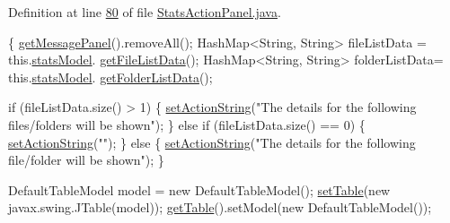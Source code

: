 Definition at line \hyperlink{L80}{80} of file \hyperlink{}{Stats\-Action\-Panel.\-java}.


\begin{DoxyCode}
                                  \{
        \hyperlink{classcom_1_1poly_1_1nlp_1_1filekommander_1_1views_1_1panels_1_1_abstract_message_panel_a2d8c613b03cb000425ae32a9a44dc805}{getMessagePanel}().removeAll();
        HashMap<String, String> fileListData = this.\hyperlink{classcom_1_1poly_1_1nlp_1_1filekommander_1_1views_1_1panels_1_1_stats_action_panel_aaefc874fb6203949c9a759791eaf06b3}{statsModel}.
      \hyperlink{classcom_1_1poly_1_1nlp_1_1filekommander_1_1views_1_1models_1_1_stats_model_abf285e0acda3ac3a582abda3bbf12987}{getFileListData}();
        HashMap<String, String> folderListData= this.\hyperlink{classcom_1_1poly_1_1nlp_1_1filekommander_1_1views_1_1panels_1_1_stats_action_panel_aaefc874fb6203949c9a759791eaf06b3}{statsModel}.
      \hyperlink{classcom_1_1poly_1_1nlp_1_1filekommander_1_1views_1_1models_1_1_stats_model_ae617bfa56a1ba5572ecb0740e78b75ad}{getFolderListData}();
        
        \textcolor{keywordflow}{if} (fileListData.size() > 1) \{
            \hyperlink{classcom_1_1poly_1_1nlp_1_1filekommander_1_1views_1_1panels_1_1_abstract_message_panel_a565a70e35ba8533880099438337eea08}{setActionString}(\textcolor{stringliteral}{"The details for the following
       files/folders will be shown"});
        \} \textcolor{keywordflow}{else} \textcolor{keywordflow}{if} (fileListData.size() == 0) \{
            \hyperlink{classcom_1_1poly_1_1nlp_1_1filekommander_1_1views_1_1panels_1_1_abstract_message_panel_a565a70e35ba8533880099438337eea08}{setActionString}(\textcolor{stringliteral}{""});
        \} \textcolor{keywordflow}{else} \{
            \hyperlink{classcom_1_1poly_1_1nlp_1_1filekommander_1_1views_1_1panels_1_1_abstract_message_panel_a565a70e35ba8533880099438337eea08}{setActionString}(\textcolor{stringliteral}{"The details for the following
       file/folder will be shown"});
        \}
        
        DefaultTableModel model = \textcolor{keyword}{new} DefaultTableModel();     
        \hyperlink{classcom_1_1poly_1_1nlp_1_1filekommander_1_1views_1_1panels_1_1_abstract_message_panel_ae66c31b95e8c1fe4d28565e7dcaf9a91}{setTable}(\textcolor{keyword}{new} javax.swing.JTable(model));     
        \hyperlink{classcom_1_1poly_1_1nlp_1_1filekommander_1_1views_1_1panels_1_1_abstract_message_panel_aab424ea4f0cf49aa1a619f21a996d6b5}{getTable}().setModel(\textcolor{keyword}{new} DefaultTableModel());    
        

\end{DoxyCode}
